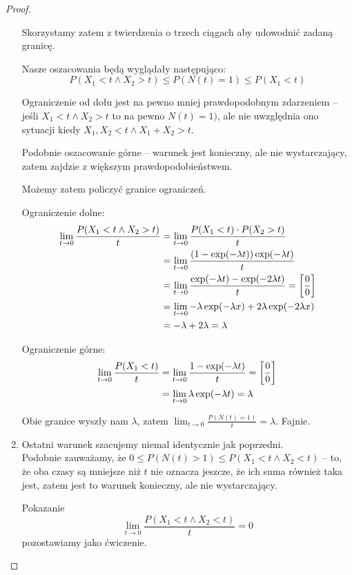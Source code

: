 \begin{proof}
\begin{enumerate}
		      Skorzystamy zatem z twierdzenia o trzech ciągach aby udowodnić zadaną granicę.

		      Nasze oszacowania będą wyglądały następująco:
		      \[
			      P(X_1 < t \land X_2 > t) \leq P(N(t) = 1) \leq P(X_1 < t)
		      \]

		      Ograniczenie od dołu jest na pewno mniej prawdopodobnym zdarzeniem -- jeśli \( X_1 < t \land X_2 > t \)
		      to na pewno \( N(t) = 1) \), ale nie uwzględnia ono sytuacji kiedy \( X_1, X_2 < t \land X_1 + X_2 > t \).

		      Podobnie oszacowanie górne -- warunek jest konieczny, ale nie wystarczający, zatem zajdzie z większym prawdopodobieństwem.

		      Możemy zatem policzyć granice ograniczeń.

		      Ograniczenie dolne:
		      \begin{align*}
			      \lim_{t \rightarrow 0} \frac{P(X_1 < t \land X_2 > t)}{t}
			       & = \lim_{t \rightarrow 0} \frac{P(X_1 < t) \cdot P(X_2 > t)}{t}                                   \\
			       & = \lim_{t \rightarrow 0} \frac{\left(1 - \exp(-\lambda t)\right)\exp(-\lambda t)}{t}                   \\
			       & = \lim_{t \rightarrow 0} \frac{\exp(-\lambda t) - \exp(-2\lambda t)}{t} = \left[\frac{0}{0}\right] \\
			       & = \lim_{t \rightarrow 0} -\lambda \exp(-\lambda x) + 2\lambda \exp(-2\lambda x)                  \\
			       & = -\lambda + 2\lambda = \lambda
		      \end{align*}

		      Ograniczenie górne:
		      \begin{align*}
			      \lim_{t \rightarrow 0} \frac{P(X_1 < t)}{t}
			       & = \lim_{t \rightarrow 0} \frac{1 - \exp(-\lambda t)}{t} = \left[\frac{0}{0}\right] \\
			       & = \lim_{t \rightarrow 0} \lambda \exp(-\lambda t) = \lambda
		      \end{align*}

		      Obie granice wyszły nam \( \lambda \), zatem \(  \lim_{t \rightarrow 0} \frac{P(N(t) = 1)}{t} = \lambda \). Fajnie.

		\item Ostatni warunek szacujemy niemal identycznie jak poprzedni. \\
		      Podobnie zauważamy, że \( 0 \leq P(N(t) > 1) \leq P(X_1 < t \land X_2 < t) \)
		      -- to, że oba czasy są mniejsze niż \( t \) nie oznacza jeszcze, że ich suma również taka jest, zatem jest to warunek konieczny, ale nie wystarczający.

		      Pokazanie \[ \lim_{t \rightarrow 0} \frac{P(X_1 < t \land X_2 < t)}{t} = 0 \] pozostawiamy jako ćwiczenie.



	\end{enumerate}
\end{proof}